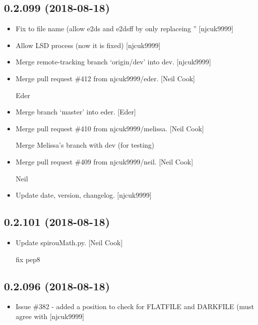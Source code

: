 \documentclass[a4paper,10pt,english]{report}
\begin{document}
\subsection{0.2.099 (2018-08-18)}
\label{\detokenize{misc/changelog:id361}}\begin{itemize}
\item {} 
Fix to file name (allow e2ds and e2dsff by only replaceing ”
{[}njcuk9999{]}

\item {} 
Allow LSD process (now it is fixed) {[}njcuk9999{]}

\item {} 
Merge remote-tracking branch ‘origin/dev’ into dev. {[}njcuk9999{]}

\item {} 
Merge pull request \#412 from njcuk9999/eder. {[}Neil Cook{]}

Eder

\item {} 
Merge branch ‘master’ into eder. {[}Eder{]}

\item {} 
Merge pull request \#410 from njcuk9999/melissa. {[}Neil Cook{]}

Merge Melissa’s branch with dev (for testing)

\item {} 
Merge pull request \#409 from njcuk9999/neil. {[}Neil Cook{]}

Neil

\item {} 
Update date, version, changelog. {[}njcuk9999{]}

\end{itemize}


\subsection{0.2.101 (2018-08-18)}
\label{\detokenize{misc/changelog:id362}}\begin{itemize}
\item {} 
Update spirouMath.py. {[}Neil Cook{]}

fix pep8

\end{itemize}


\subsection{0.2.096 (2018-08-18)}
\label{\detokenize{misc/changelog:id363}}\begin{itemize}
\item {} 
Issue \#382 - added a position to check for FLATFILE and DARKFILE (must
agree with  {[}njcuk9999{]}

\end{itemize}
\end{document}
